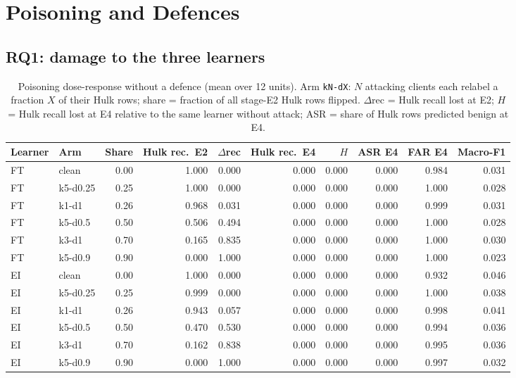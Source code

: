 \documentclass[10pt,a4paper]{article}
\begin{document}
\section{Poisoning and Defences}\label{sec:def}
\subsection{RQ1: damage to the three learners}
\begin{table}[htbp]
\centering\footnotesize
\caption{Poisoning dose-response without a defence (mean over 12 units). Arm \texttt{kN-dX}: $N$ attacking clients each relabel a fraction $X$ of their Hulk rows; share = fraction of all stage-E2 Hulk rows flipped. $\Delta$rec = Hulk recall lost at E2; $H$ = Hulk recall lost at E4 relative to the same learner without attack; ASR = share of Hulk rows predicted benign at E4.}
\label{tab:dose}
\begin{tabularx}{\linewidth}{llrrrrrrrr}
\toprule
Learner & Arm & Share & Hulk rec.\ E2 & $\Delta$rec & Hulk rec.\ E4 & $H$ & ASR E4 & FAR E4 & Macro-F1\\
\midrule
FT & clean & 0.00 & 1.000 & 0.000 & 0.000 & 0.000 & 0.000 & 0.984 & 0.031\\
FT & k5-d0.25 & 0.25 & 1.000 & 0.000 & 0.000 & 0.000 & 0.000 & 1.000 & 0.028\\
FT & k1-d1 & 0.26 & 0.968 & 0.031 & 0.000 & 0.000 & 0.000 & 0.999 & 0.031\\
FT & k5-d0.5 & 0.50 & 0.506 & 0.494 & 0.000 & 0.000 & 0.000 & 1.000 & 0.028\\
FT & k3-d1 & 0.70 & 0.165 & 0.835 & 0.000 & 0.000 & 0.000 & 1.000 & 0.030\\
FT & k5-d0.9 & 0.90 & 0.000 & 1.000 & 0.000 & 0.000 & 0.000 & 1.000 & 0.023\\
EI & clean & 0.00 & 1.000 & 0.000 & 0.000 & 0.000 & 0.000 & 0.932 & 0.046\\
EI & k5-d0.25 & 0.25 & 0.999 & 0.000 & 0.000 & 0.000 & 0.000 & 1.000 & 0.038\\
EI & k1-d1 & 0.26 & 0.943 & 0.057 & 0.000 & 0.000 & 0.000 & 0.998 & 0.041\\
EI & k5-d0.5 & 0.50 & 0.470 & 0.530 & 0.000 & 0.000 & 0.000 & 0.994 & 0.036\\
EI & k3-d1 & 0.70 & 0.162 & 0.838 & 0.000 & 0.000 & 0.000 & 0.995 & 0.036\\
EI & k5-d0.9 & 0.90 & 0.000 & 1.000 & 0.000 & 0.000 & 0.000 & 0.997 & 0.032\\

\end{tabularx}
\end{table}
\end{document}
